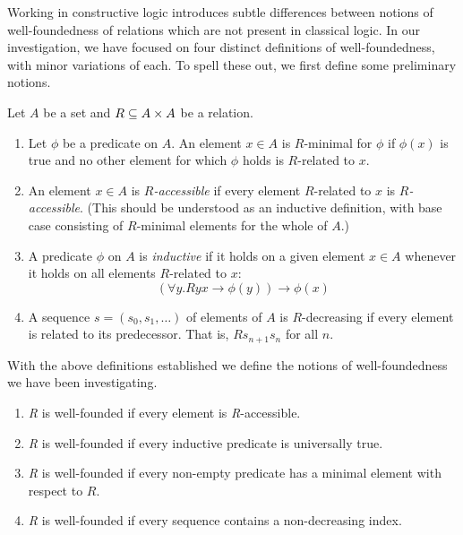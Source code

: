\documentclass{scrartcl}
\begin{document}

Working in constructive logic introduces subtle differences between notions of well-foundedness of relations
which are not present in classical logic.  In our investigation, we have focused on four distinct definitions of well-foundedness, with minor variations of each. To spell these out, we first define some preliminary notions.

\begin{dfn} Let $A$ be a set and $R \subseteq A \times A$ be a relation.
\begin{enumerate}
  \item Let $\phi$ be a predicate on $A$. An element $x \in A$ is $R$-minimal for $\phi$ if $\phi(x)$ is true and no other element for which $\phi$ holds is $R$-related to $x$.
  \item An element $x \in A$ is \textit{$R$-accessible} if every element $R$-related to $x$ is \textit{$R$-accessible}.  (This should be understood as an inductive definition, with base case consisting of $R$-minimal elements for the whole of $A$.)
    \item A predicate $\phi$ on $A$ is \emph{inductive} if it holds on a given element $x \in A$ whenever it holds on all elements $R$-related to $x$:
    \[ (\forall y. Ryx \to \phi(y)) \to \phi(x) \]
    \item A sequence $s = (s_0,s_1,\dots)$ of elements of $A$ is $R$-decreasing
    if every element is related to its predecessor.  That is, $Rs_{n+1}s_n$ for all $n$.
\end{enumerate}
\end{dfn}
With the above definitions established we define the notions of well-foundedness we have been investigating.
\begin{dfn} \hfil
  \begin{enumerate}
    \item \textit{R} is well-founded if every element is \textit{R}-accessible.
    \item \textit{R} is well-founded if every inductive predicate is universally true.
    \item \textit{R} is well-founded if every non-empty predicate has a minimal element with respect to $R$.
    \item \textit{R} is well-founded if every sequence contains a non-decreasing index.
  \end{enumerate}
\end{dfn}
\end{document}
